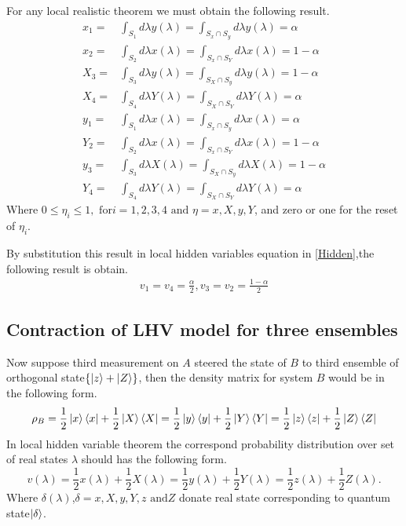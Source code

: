 For any local realistic theorem we must obtain the following result.
\begin{align*}
x_1=&\int_{S_1} d\lambda y(\lambda)=\int_{S_x\cap S_y} d\lambda y(\lambda)=\alpha\\
x_2=&\int_{S_2} d\lambda x(\lambda)=\int_{S_x \cap S_Y} d\lambda x(\lambda)=1-\alpha\\
X_3=&\int_{S_3} d\lambda y(\lambda)=\int_{S_X \cap S_y} d\lambda y(\lambda)=1-\alpha\\
X_4=&\int_{S_4} d\lambda Y(\lambda)=\int_{S_X \cap S_Y} d\lambda Y(\lambda)=\alpha\\
y_1=&\int_{S_1} d\lambda x(\lambda)=\int_{S_x\cap S_y} d\lambda x(\lambda)=\alpha\\
Y_2=&\int_{S_2} d\lambda x(\lambda)=\int_{S_x \cap S_Y} d\lambda x(\lambda)=1-\alpha\\
y_3=&\int_{S_3} d\lambda X(\lambda)=\int_{S_X \cap S_y} d\lambda X(\lambda)=1-\alpha\\
Y_4=&\int_{S_4} d\lambda Y(\lambda)=\int_{S_X \cap S_Y} d\lambda Y(\lambda)=\alpha
\end{align*}
Where $0\leq \eta_i\leq 1, \text{ for} i=1,2,3,4 \text{ and } \eta= x,X,y,Y$, and zero or one for the reset of $\eta_i$.

By substitution this result in local hidden variables equation in \ref{Hidden},the following result is obtain.
\begin{align*}
v_1=v_4=\frac{\alpha}{2}, v_3=v_2=\frac{1-\alpha}{2}
\end{align*}






\subsection{Contraction of LHV model for three ensembles}\label{ss3}\hfill \break
Now suppose third measurement on $A$  steered the state of $B$ to third ensemble of orthogonal state$\{\ket{z}+\ket{Z}\}$, then the density matrix for system $B$ would be in the following form.
\begin{equation}
\rho_B=\frac{1}{2}\ket{x}\bra{x}+\frac{1}{2}\ket{X}\bra{X}=\frac{1}{2}\ket{y}\bra{y}+\frac{1}{2}\ket{Y}\bra{Y}=\frac{1}{2}\ket{z}\bra{z}+\frac{1}{2}\ket{Z}\bra{Z}
\end{equation}
In local hidden variable theorem the correspond probability distribution over set of real states $\lambda$ should has the following form.
\begin{equation}
v(\lambda)=\frac{1}{2} x(\lambda)+\frac{1}{2} X(\lambda)=\frac{1}{2} y(\lambda)+\frac{1}{2}Y(\lambda)=\frac{1}{2}z(\lambda)+\frac{1}{2}Z(\lambda).
\end{equation}
Where $\delta(\lambda)$,$\delta=x,X,y,Y,z \text{ and} Z$ donate real state corresponding to quantum state$\ket{\delta}$.

